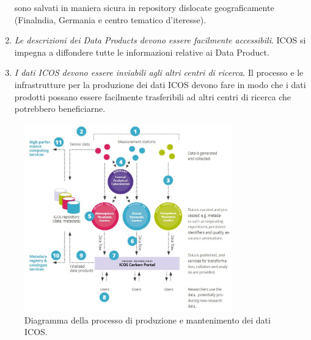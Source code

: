 \begin{enumerate}
    sono salvati in maniera sicura in repository dislocate geograficamente (Finalndia, Germania e centro tematico d'iteresse).
    \item \textit{Le descrizioni dei Data Products devono essere facilmente accessibili}. ICOS si impegna a diffondere tutte le informazioni relative ai Data Product.
    \item \textit{I dati ICOS devono essere inviabili agli altri centri di ricerca}. Il processo e le infrastrutture per la produzione dei dati ICOS devono fare in modo che i dati prodotti possano essere facilmente 
    trasferibili ad altri centri di ricerca che potrebbero beneficiarne.
\end{enumerate}

\begin{figure}[h!]
    \centering
    \includegraphics[width=0.8\textwidth]{figures/data-process.JPG}
    \caption{Diagramma della processo di produzione e mantenimento dei dati ICOS.}
    \label{figure:DOIex}
\end{figure}
